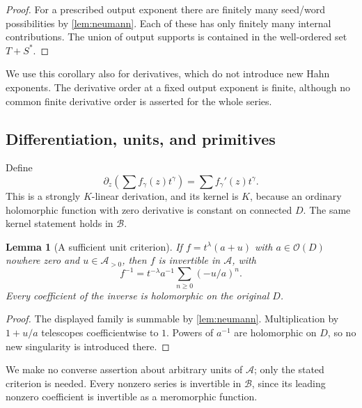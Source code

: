 \documentclass[11pt,a4paper]{article}
\numberwithin{equation}{section}
\newtheorem{lemma}[lemma]{Lemma}
\theoremstyle{definition}
\theoremstyle{remark}
\newcommand{\A}{\mathcal A}
\newcommand{\Oh}{\mathcal O}
\begin{document}
\begin{proof}
For a prescribed output exponent there are finitely many seed/word
possibilities by \cref{lem:neumann}.  Each of these has only finitely many
internal contributions.  The union of output supports is contained in the
well-ordered set $T+S^*$.
\end{proof}

We use this corollary also for derivatives, which do not introduce new Hahn
exponents.  The derivative order at a fixed output exponent is finite,
although no common finite derivative order is asserted for the whole series.

\subsection{Differentiation, units, and primitives}

Define
\[
 \partial_z\left(\sum f_\gamma(z)t^\gamma\right)
       =\sum f_\gamma'(z)t^\gamma.
\]
This is a strongly $K$-linear derivation, and its kernel is $K$, because an
ordinary holomorphic function with zero derivative is constant on connected
$D$.  The same kernel statement holds in $\mathcal B$.

\begin{lemma}[A sufficient unit criterion]\label{lem:unit}
If $f=t^\lambda(a+u)$ with $a\in\Oh(D)$ nowhere zero and
$u\in\A_{>0}$, then $f$ is invertible in $\A$, with
\[
 f^{-1}=t^{-\lambda}a^{-1}\sum_{n\geq0}(-u/a)^n.
\]
Every coefficient of the inverse is holomorphic on the original $D$.
\end{lemma}
\begin{proof}
The displayed family is summable by \cref{lem:neumann}.  Multiplication by
$1+u/a$ telescopes coefficientwise to $1$.  Powers of $a^{-1}$ are
holomorphic on $D$, so no new singularity is introduced there.
\end{proof}

We make no converse assertion about arbitrary units of $\A$; only the
stated criterion is needed.  Every nonzero series is invertible in
$\mathcal B$, since its leading nonzero coefficient is invertible as a
meromorphic function.
\end{document}
